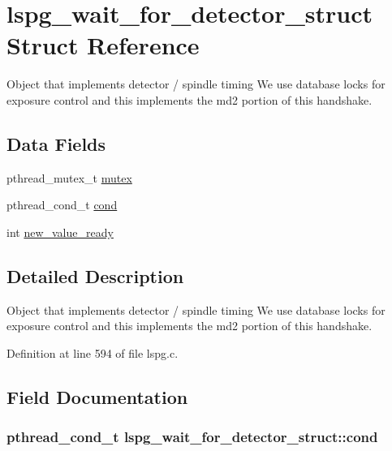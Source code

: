 \hypertarget{structlspg__wait__for__detector__struct}{
\section{lspg\_\-wait\_\-for\_\-detector\_\-struct Struct Reference}
\label{structlspg__wait__for__detector__struct}
}


Object that implements detector / spindle timing We use database locks for exposure control and this implements the md2 portion of this handshake.  
\subsection*{Data Fields}
\begin{DoxyCompactItemize}
\item 
pthread\_\-mutex\_\-t \hyperlink{structlspg__wait__for__detector__struct_a958e9fe59e671e61f95c2ce796ba24ce}{mutex}
\item 
pthread\_\-cond\_\-t \hyperlink{structlspg__wait__for__detector__struct_aa97388f93ca5099196ba0da1e4a5b7bb}{cond}
\item 
int \hyperlink{structlspg__wait__for__detector__struct_ad950e85c70c4473c5c7c40f8ceeae61d}{new\_\-value\_\-ready}
\end{DoxyCompactItemize}


\subsection{Detailed Description}
Object that implements detector / spindle timing We use database locks for exposure control and this implements the md2 portion of this handshake. 

Definition at line 594 of file lspg.c.

\subsection{Field Documentation}
\hypertarget{structlspg__wait__for__detector__struct_aa97388f93ca5099196ba0da1e4a5b7bb}{
\subsubsection[{cond}]{\setlength{\rightskip}{0pt plus 5cm}pthread\_\-cond\_\-t {\bf lspg\_\-wait\_\-for\_\-detector\_\-struct::cond}}}
\label{structlspg__wait__for__detector__struct_aa97388f93ca5099196ba0da1e4a5b7bb}


